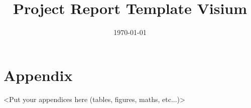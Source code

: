 \documentclass[a4paper]{article}
\title{Project Report Template Visium}
\date{\today}
\begin{document}
\maketitle
\setlength{\headheight}{25pt}
\thispagestyle{fancy}













\newpage



\newpage
\appendix 
\section{Appendix}
\label{sec:appendix}
<Put your appendices here (tables, figures, maths, etc...)>
\end{document}
